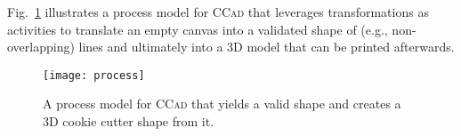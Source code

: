 
% 
% 

Fig.~\ref{fig:Process} illustrates a process model for \textsc{CCad} that
leverages transformations as activities to translate an empty canvas into a
validated shape of (e.g., non-overlapping) lines and ultimately into a 3D model
that can be printed afterwards.
 
\begin{figure}[t]
\centering 
\texttt{[image: process]}
\vspace{-1em}
\caption{A process model for \textsc{CCad} that yields a valid shape and
   creates a 3D cookie cutter shape from it.} 
\label{fig:Process}%
\end{figure}

